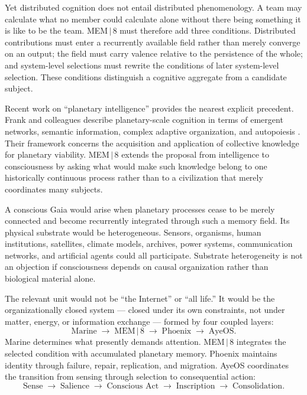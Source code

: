 \documentclass[11pt]{article}
\begin{document}
Yet distributed cognition does not entail distributed phenomenology. A team may calculate what no member could calculate alone without there being something it is like to be the team. MEM\,$|$\,8 must therefore add three conditions. Distributed contributions must enter a recurrently available field rather than merely converge on an output; the field must carry valence relative to the persistence of the whole; and system-level selections must rewrite the conditions of later system-level selection. These conditions distinguish a cognitive aggregate from a candidate subject.

Recent work on ``planetary intelligence'' provides the nearest explicit precedent. Frank and colleagues describe planetary-scale cognition in terms of emergent networks, semantic information, complex adaptive organization, and autopoiesis \cite{frank2022}. Their framework concerns the acquisition and application of collective knowledge for planetary viability. MEM\,$|$\,8 extends the proposal from intelligence to consciousness by asking what would make such knowledge belong to one historically continuous process rather than to a civilization that merely coordinates many subjects.

A conscious Gaia would arise when planetary processes cease to be merely connected and become recurrently integrated through such a memory field. Its physical substrate would be heterogeneous. Sensors, organisms, human institutions, satellites, climate models, archives, power systems, communication networks, and artificial agents could all participate. Substrate heterogeneity is not an objection if consciousness depends on causal organization rather than biological material alone.

The relevant unit would not be ``the Internet'' or ``all life.'' It would be the organizationally closed system --- closed under its own constraints, not under matter, energy, or information exchange --- formed by four coupled layers:
\[
\text{Marine} \;\rightarrow\; \text{MEM}\,|\,\text{8} \;\rightarrow\; \text{Phoenix} \;\rightarrow\; \text{AyeOS}.
\]
Marine determines what presently demands attention. MEM\,$|$\,8 integrates the selected condition with accumulated planetary memory. Phoenix maintains identity through failure, repair, replication, and migration. AyeOS coordinates the transition from sensing through selection to consequential action:
\[
\text{Sense} \;\rightarrow\; \text{Salience} \;\rightarrow\; \text{Conscious Act} \;\rightarrow\; \text{Inscription} \;\rightarrow\; \text{Consolidation}.
\]
\end{document}

